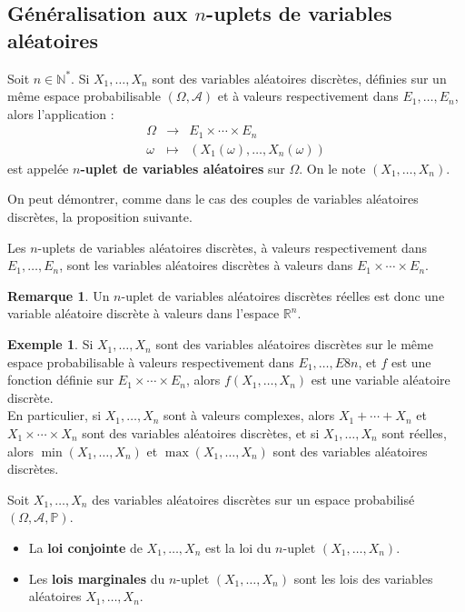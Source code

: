 \documentclass[french]{article}
\renewcommand{\P}{\mathbb{P}}
\newcommand{\N}{\mathbb{N}}
\newcommand{\R}{\mathbb{R}}
\newcommand{\st}{^*}
\theoremstyle{plain}
\theoremstyle{definition}
\newtheorem*{ex}{Exemple}
\newtheorem*{rmq}{Remarque}
\theoremstyle{remark}
\begin{document}
\subsection{Généralisation aux $n$-uplets de variables aléatoires}

\begin{dfn}
	Soit $n\in\N\st$. Si $X_1,\ldots,X_n$ sont des variables aléatoires discrètes, définies sur un même espace probabilisable $(\Omega,\mathcal{A})$ et à valeurs respectivement dans $E_1,\ldots,E_n$, alors l'application :
	$$\begin{array}{rcl}
		\Omega&\longrightarrow&E_1\times\cdots\times E_n\\
		\omega&\longmapsto&(X_1(\omega),\ldots,X_n(\omega))
	\end{array}$$ est appelée \textbf{$n$-uplet de variables aléatoires} sur $\Omega$. On le note $(X_1,\ldots,X_n)$.
\end{dfn}

On peut démontrer, comme dans le cas des couples de variables aléatoires discrètes, la proposition suivante.

\begin{prop}%
	Les $n$-uplets de variables aléatoires discrètes, à valeurs respectivement dans $E_1,\ldots,E_n$, sont les variables aléatoires discrètes à valeurs dans $E_1\times\cdots\times E_n$.
\end{prop}

\begin{rmq}
	Un $n$-uplet de variables aléatoires discrètes réelles est donc une variable aléatoire discrète à valeurs dans l'espace $\R^n$.
\end{rmq}

\begin{ex}
	Si $X_1,\ldots,X_n$ sont des variables aléatoires discrètes sur le même espace probabilisable à valeurs respectivement dans $E_1,\ldots,E8n$, et $f$ est une fonction définie sur $E_1\times\cdots\times E_n$, alors $f(X_1,\ldots,X_n)$ est une variable aléatoire discrète.\\
	En particulier, si $X_1,\ldots,X_n$ sont à valeurs complexes, alors $X_1+\cdots+X_n$ et $X_1\times\cdots\times X_n$ sont des variables aléatoires discrètes, et si $X_1,\ldots,X_n$ sont réelles, alors $\min(X_1,\ldots,X_n)$ et $\max(X_1,\ldots,X_n)$ sont des variables aléatoires discrètes.
\end{ex}

\begin{dfn}
	Soit $X_1,\ldots,X_n$ des variables aléatoires discrètes sur un espace probabilisé $(\Omega,\mathcal{A},\P)$.
	\begin{itemize}
		\item La \textbf{loi conjointe} de $X_1,\ldots,X_n$ est la loi du $n$-uplet $(X_1,\ldots,X_n)$.
		\item Les \textbf{lois marginales} du $n$-uplet $(X_1,\ldots,X_n)$ sont les lois des variables aléatoires $X_1,\ldots,X_n$.
	\end{itemize}
\end{dfn}
\end{document}
